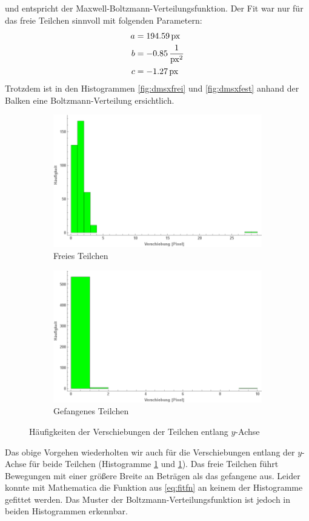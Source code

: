 \documentclass[a4paper,titlepage]{scrartcl}
\numberwithin{equation}{section}
\begin{document}
und entspricht der Maxwell-Boltzmann-Verteilungsfunktion. Der Fit war nur für das freie Teilchen sinnvoll mit folgenden Parametern:
\begin{align*}
a&=\unit[194.59]{px}\\
b&=\unit[-0.85]{\frac{1}{px^2}}\\
c&=\unit[-1.27]{px}\\
\end{align*}
Trotzdem ist in den Histogrammen \ref{fig:dmsxfrei} und \ref{fig:dmsxfest} anhand der Balken eine Boltzmann-Verteilung ersichtlich.
\begin{figure}[H]
\centering
\begin{subfigure}{.5\textwidth}
  \centering
  \includegraphics[width=.95\linewidth]{images/frei-y-dms.png}
  \caption{Freies Teilchen}
  \label{fig:dmsyfrei}
\end{subfigure}%
\begin{subfigure}{.5\textwidth}
  \centering
  \includegraphics[width=.95\linewidth]{images/fest-y-dms.png}
  \caption{Gefangenes Teilchen}
  \label{fig:dmsyfest}
\end{subfigure}
\caption{Häufigkeiten der Verschiebungen der Teilchen entlang $y$-Achse}
\label{fig:dmsy}
\end{figure}
Das obige Vorgehen wiederholten wir auch für die Verschiebungen entlang der $y$-Achse für beide Teilchen (Histogramme \ref{fig:dmsyfrei} und \ref{fig:dmsyfrei}). Das freie Teilchen führt Bewegungen mit einer größere Breite an Beträgen als das gefangene aus. Leider konnte mit Mathematica die Funktion aus \ref{eq:fitfn} an keinem der Histogramme gefittet werden. Das Muster der Boltzmann-Verteilungsfunktion ist jedoch in beiden Histogrammen erkennbar.
\end{document}
